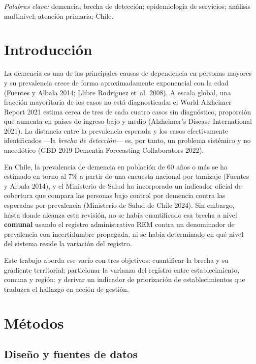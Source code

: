 \documentclass[
  spanish,
  letterpaper,
  DIV=11,
  numbers=noendperiod]{scrartcl}
\begin{document}
\emph{Palabras clave:} demencia; brecha de detección; epidemiología de
servicios; análisis multinivel; atención primaria; Chile.

\section{Introducción}\label{introducciuxf3n}

La demencia es una de las principales causas de dependencia en personas
mayores y su prevalencia crece de forma aproximadamente exponencial con
la edad (Fuentes y Albala 2014; {Llibre Rodriguez et~al.} 2008). A
escala global, una fracción mayoritaria de los casos no está
diagnosticada: el World Alzheimer Report 2021 estima cerca de tres de
cada cuatro casos sin diagnóstico, proporción que aumenta en países de
ingreso bajo y medio (Alzheimer's Disease International 2021). La
distancia entre la prevalencia esperada y los casos efectivamente
identificados ---la \emph{brecha de detección}--- es, por tanto, un
problema sistémico y no anecdótico (GBD 2019 Dementia Forecasting
Collaborators 2022).

En Chile, la prevalencia de demencia en población de 60 años o más se ha
estimado en torno al 7\% a partir de una encuesta nacional por tamizaje
(Fuentes y Albala 2014), y el Ministerio de Salud ha incorporado un
indicador oficial de cobertura que compara las personas bajo control por
demencia contra las esperadas por prevalencia (Ministerio de Salud de
Chile 2024). Sin embargo, hasta donde alcanza esta revisión, no se había
cuantificado esa brecha a nivel \textbf{comunal} usando el registro
administrativo REM contra un denominador de prevalencia con
incertidumbre propagada, ni se había determinado en qué nivel del
sistema reside la variación del registro.

Este trabajo aborda ese vacío con tres objetivos: cuantificar la brecha
y su gradiente territorial; particionar la varianza del registro entre
establecimiento, comuna y región; y derivar un indicador de priorización
de establecimientos que traduzca el hallazgo en acción de gestión.

\section{Métodos}\label{muxe9todos}

\subsection{Diseño y fuentes de
datos}\label{diseuxf1o-y-fuentes-de-datos}
\end{document}
